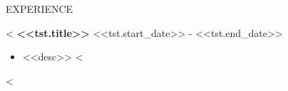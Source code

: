 \documentclass{faangpath_simple_template_resume} %
\begin{document}

\begin{rSection}{EXPERIENCE}

<%
\textbf{<<tst.title>>} \hfill <<tst.start_date>> - <<tst.end_date>>\\
 \begin{itemize}
     <%
     \item <<desc>>
     <%
 \end{itemize}
<%

\end{rSection}
\end{document}
